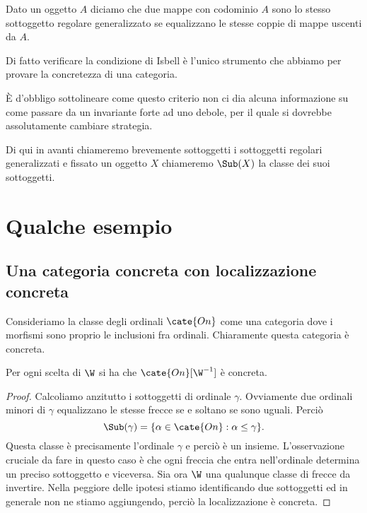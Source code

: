 \documentclass[10pt,a4paper]{amsart}
\begin{document}
\begin{definition}
Dato un oggetto $A$ diciamo che due mappe con codominio $A$ sono lo stesso sottoggetto regolare generalizzato se equalizzano le stesse coppie di mappe uscenti da $A$.
\end{definition}

Di fatto verificare la condizione di Isbell è l'unico strumento che abbiamo per provare la concretezza di una categoria.

È d'obbligo sottolineare come questo criterio non ci dia alcuna informazione su come passare da un invariante forte ad uno debole, per il quale si dovrebbe assolutamente cambiare strategia.

Di qui in avanti chiameremo brevemente sottoggetti i sottoggetti regolari generalizzati e fissato un oggetto $X$ chiameremo $\Sub(X)$ la classe dei suoi sottoggetti.

\section{Qualche esempio}


\subsection{Una categoria concreta con localizzazione concreta}

Consideriamo la classe degli ordinali $\cate{On}$ come una categoria dove i morfismi sono proprio le inclusioni fra ordinali. Chiaramente questa categoria è concreta.

\begin{proposition} Per ogni scelta di $\W$ si ha che $\cate{On}[\W^{-1}]$ è concreta.

\begin{proof}
Calcoliamo anzitutto i sottoggetti di ordinale $\gamma$. Ovviamente due ordinali minori di $\gamma$ equalizzano le stesse frecce se e soltano se sono uguali. Perciò $$\Sub(\gamma) = \{\alpha \in \cate{On} : \alpha \leq \gamma \}.$$ Questa classe è precisamente l'ordinale $\gamma$ e perciò è un insieme. L'osservazione cruciale da fare in questo caso è che ogni freccia che entra nell'ordinale determina un preciso sottoggetto e viceversa.
Sia ora $\W$ una qualunque classe di frecce da invertire. Nella peggiore delle ipotesi stiamo identificando due sottoggetti ed in generale non ne stiamo aggiungendo, perciò la localizzazione è concreta.
\end{proof}
\end{proposition}
\end{document}

